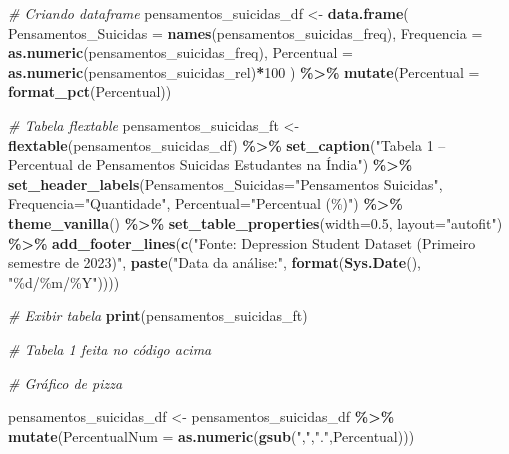 \documentclass[
]{article}
\newenvironment{Shaded}{\begin{snugshade}}{\end{snugshade}}
\newcommand{\AttributeTok}[1]{\textcolor[rgb]{0.13,0.29,0.53}{#1}}
\newcommand{\CommentTok}[1]{\textcolor[rgb]{0.56,0.35,0.01}{\textit{#1}}}
\newcommand{\DecValTok}[1]{\textcolor[rgb]{0.00,0.00,0.81}{#1}}
\newcommand{\FloatTok}[1]{\textcolor[rgb]{0.00,0.00,0.81}{#1}}
\newcommand{\FunctionTok}[1]{\textcolor[rgb]{0.13,0.29,0.53}{\textbf{#1}}}
\newcommand{\NormalTok}[1]{#1}
\newcommand{\OtherTok}[1]{\textcolor[rgb]{0.56,0.35,0.01}{#1}}
\newcommand{\SpecialCharTok}[1]{\textcolor[rgb]{0.81,0.36,0.00}{\textbf{#1}}}
\newcommand{\StringTok}[1]{\textcolor[rgb]{0.31,0.60,0.02}{#1}}
\begin{document}
\begin{Shaded}
\begin{Highlighting}[]
\CommentTok{\# Criando dataframe}
\NormalTok{pensamentos\_suicidas\_df }\OtherTok{\textless{}{-}} \FunctionTok{data.frame}\NormalTok{(}
  \AttributeTok{Pensamentos\_Suicidas =} \FunctionTok{names}\NormalTok{(pensamentos\_suicidas\_freq),}
  \AttributeTok{Frequencia =} \FunctionTok{as.numeric}\NormalTok{(pensamentos\_suicidas\_freq),}
  \AttributeTok{Percentual =} \FunctionTok{as.numeric}\NormalTok{(pensamentos\_suicidas\_rel)}\SpecialCharTok{*}\DecValTok{100}
\NormalTok{) }\SpecialCharTok{\%\textgreater{}\%}
  \FunctionTok{mutate}\NormalTok{(}\AttributeTok{Percentual =} \FunctionTok{format\_pct}\NormalTok{(Percentual))}

\CommentTok{\# Tabela flextable}
\NormalTok{pensamentos\_suicidas\_ft }\OtherTok{\textless{}{-}} \FunctionTok{flextable}\NormalTok{(pensamentos\_suicidas\_df) }\SpecialCharTok{\%\textgreater{}\%}
  \FunctionTok{set\_caption}\NormalTok{(}\StringTok{"Tabela 1 – Percentual de Pensamentos Suicidas Estudantes na Índia"}\NormalTok{) }\SpecialCharTok{\%\textgreater{}\%}
  \FunctionTok{set\_header\_labels}\NormalTok{(}\AttributeTok{Pensamentos\_Suicidas=}\StringTok{"Pensamentos Suicidas"}\NormalTok{, }\AttributeTok{Frequencia=}\StringTok{"Quantidade"}\NormalTok{, }\AttributeTok{Percentual=}\StringTok{"Percentual (\%)"}\NormalTok{) }\SpecialCharTok{\%\textgreater{}\%}
  \FunctionTok{theme\_vanilla}\NormalTok{() }\SpecialCharTok{\%\textgreater{}\%}
  \FunctionTok{set\_table\_properties}\NormalTok{(}\AttributeTok{width=}\FloatTok{0.5}\NormalTok{, }\AttributeTok{layout=}\StringTok{"autofit"}\NormalTok{) }\SpecialCharTok{\%\textgreater{}\%}
  \FunctionTok{add\_footer\_lines}\NormalTok{(}\FunctionTok{c}\NormalTok{(}\StringTok{"Fonte: Depression Student Dataset (Primeiro semestre de 2023)"}\NormalTok{, }\FunctionTok{paste}\NormalTok{(}\StringTok{"Data da análise:"}\NormalTok{, }\FunctionTok{format}\NormalTok{(}\FunctionTok{Sys.Date}\NormalTok{(), }\StringTok{"\%d/\%m/\%Y"}\NormalTok{))))}

\CommentTok{\# Exibir tabela}
\FunctionTok{print}\NormalTok{(pensamentos\_suicidas\_ft)}

\CommentTok{\# Tabela 1 feita no código acima}

\CommentTok{\# Gráfico de pizza}

\NormalTok{pensamentos\_suicidas\_df }\OtherTok{\textless{}{-}}\NormalTok{ pensamentos\_suicidas\_df }\SpecialCharTok{\%\textgreater{}\%} \FunctionTok{mutate}\NormalTok{(}\AttributeTok{PercentualNum =} \FunctionTok{as.numeric}\NormalTok{(}\FunctionTok{gsub}\NormalTok{(}\StringTok{","}\NormalTok{,}\StringTok{"."}\NormalTok{,Percentual)))}


\end{Highlighting}
\end{Shaded}
\end{document}
